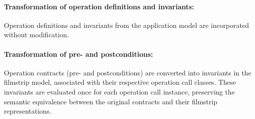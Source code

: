 \paragraph{Transformation of operation definitions and invariants:} Operation 
definitions and invariants from the application model are incorporated without 
modification.
\vspace{-1.2em}
\paragraph{Transformation of pre- and postconditions:} Operation contracts (pre- and 
postconditions) are converted into invariants in the filmstrip model, associated with 
their respective operation call classes. These invariants are evaluated once for each 
operation call instance, preserving the semantic equivalence between the original 
contracts and their filmstrip representations.

